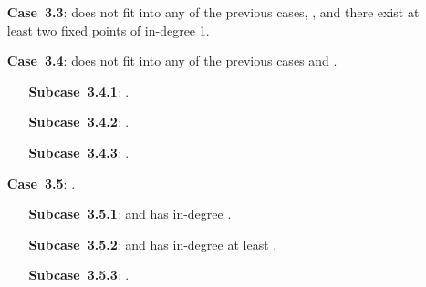 \documentclass{amsart}
\begin{document}
{\begin{enumerate}[leftmargin=*,widest=\textbf{Supercase~1}]
\begin{enumerate}[leftmargin=*,widest=\textbf{Case~3.1}]
Let  be the smallest state such a~state with the largest  such that .
\begin{enumerate}[leftmargin=*,widest=\textbf{Subcase~3.2.1}]
\item[\textbf{Subcase~3.2.1}:]  and .
\item[\textbf{Subcase~3.2.2}:] , , and  has in-degree at least .
\item[\textbf{Subcase~3.2.3}:] , , and  has in-degree .
\item[\textbf{Subcase~3.2.4}:] .
\end{enumerate}
\item[\textbf{Case~3.3}:]  does not fit into any of the previous cases, , and there exist at least two fixed points of in-degree 1.
\item[\textbf{Case~3.4}:]  does not fit into any of the previous cases and .
\begin{enumerate}[leftmargin=*,widest=\textbf{Subcase~3.4.1}]
\item[\textbf{Subcase~3.4.1}:] .
\item[\textbf{Subcase~3.4.2}:] .
\item[\textbf{Subcase~3.4.3}:] .
\end{enumerate}
\item[\textbf{Case~3.5}:] .
\begin{enumerate}[leftmargin=*,widest=\textbf{Subcase~3.5.1}]
\item[\textbf{Subcase~3.5.1}:]  and  has in-degree .
\item[\textbf{Subcase~3.5.2}:]  and  has in-degree at least .
\item[\textbf{Subcase~3.5.3}:] .
\end{enumerate}
\end{enumerate}
\end{enumerate}}
\end{document}
